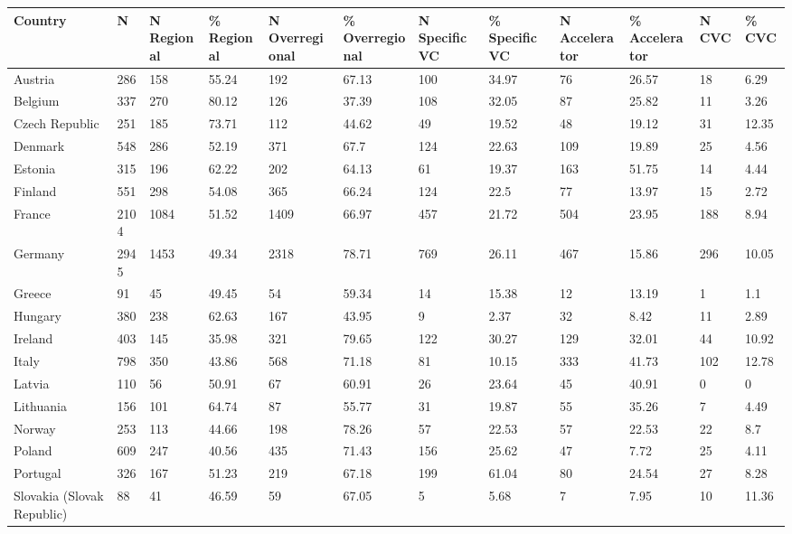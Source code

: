 \begin{tabular}{llllllllllll}
  \toprule
Country & N & N Regional & \% Regional & N Overregional & \% Overregional & N Specific VC & \% Specific VC & N Accelerator & \% Accelerator & N CVC & \% CVC \\ 
  \midrule
Austria & 286 & 158 & 55.24 & 192 & 67.13 & 100 & 34.97 & 76 & 26.57 & 18 & 6.29 \\ 
  Belgium & 337 & 270 & 80.12 & 126 & 37.39 & 108 & 32.05 & 87 & 25.82 & 11 & 3.26 \\ 
  Czech Republic & 251 & 185 & 73.71 & 112 & 44.62 & 49 & 19.52 & 48 & 19.12 & 31 & 12.35 \\ 
  Denmark & 548 & 286 & 52.19 & 371 & 67.7 & 124 & 22.63 & 109 & 19.89 & 25 & 4.56 \\ 
  Estonia & 315 & 196 & 62.22 & 202 & 64.13 & 61 & 19.37 & 163 & 51.75 & 14 & 4.44 \\ 
  Finland & 551 & 298 & 54.08 & 365 & 66.24 & 124 & 22.5 & 77 & 13.97 & 15 & 2.72 \\ 
  France & 2104 & 1084 & 51.52 & 1409 & 66.97 & 457 & 21.72 & 504 & 23.95 & 188 & 8.94 \\ 
  Germany & 2945 & 1453 & 49.34 & 2318 & 78.71 & 769 & 26.11 & 467 & 15.86 & 296 & 10.05 \\ 
  Greece & 91 & 45 & 49.45 & 54 & 59.34 & 14 & 15.38 & 12 & 13.19 & 1 & 1.1 \\ 
  Hungary & 380 & 238 & 62.63 & 167 & 43.95 & 9 & 2.37 & 32 & 8.42 & 11 & 2.89 \\ 
  Ireland & 403 & 145 & 35.98 & 321 & 79.65 & 122 & 30.27 & 129 & 32.01 & 44 & 10.92 \\ 
  Italy & 798 & 350 & 43.86 & 568 & 71.18 & 81 & 10.15 & 333 & 41.73 & 102 & 12.78 \\ 
  Latvia & 110 & 56 & 50.91 & 67 & 60.91 & 26 & 23.64 & 45 & 40.91 & 0 & 0 \\ 
  Lithuania & 156 & 101 & 64.74 & 87 & 55.77 & 31 & 19.87 & 55 & 35.26 & 7 & 4.49 \\ 
  Norway & 253 & 113 & 44.66 & 198 & 78.26 & 57 & 22.53 & 57 & 22.53 & 22 & 8.7 \\ 
  Poland & 609 & 247 & 40.56 & 435 & 71.43 & 156 & 25.62 & 47 & 7.72 & 25 & 4.11 \\ 
  Portugal & 326 & 167 & 51.23 & 219 & 67.18 & 199 & 61.04 & 80 & 24.54 & 27 & 8.28 \\ 
  Slovakia (Slovak Republic) & 88 & 41 & 46.59 & 59 & 67.05 & 5 & 5.68 & 7 & 7.95 & 10 & 11.36 \\ 

\end{tabular}
